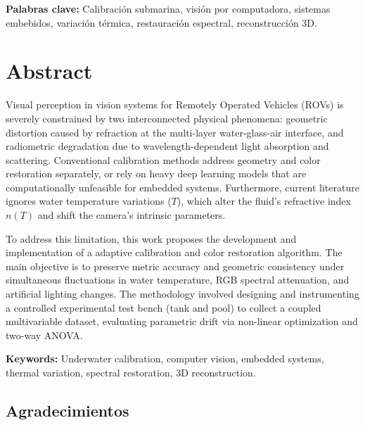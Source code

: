 \documentclass[12pt,letterpaper,spanish,twoside,openright]{report}
\begin{document}
\vspace{1em}
\noindent\textbf{Palabras clave:} Calibración submarina, visión por computadora, sistemas embebidos, variación térmica, restauración espectral, reconstrucción 3D.

\cleardoublepage

\chapter*{Abstract}
Visual perception in vision systems for Remotely Operated Vehicles (ROVs) is severely constrained by two interconnected physical phenomena: geometric distortion caused by refraction at the multi-layer water-glass-air interface, and radiometric degradation due to wavelength-dependent light absorption and scattering. Conventional calibration methods address geometry and color restoration separately, or rely on heavy deep learning models that are computationally unfeasible for embedded systems. Furthermore, current literature ignores water temperature variations ($T$), which alter the fluid's refractive index $n(T)$ and shift the camera's intrinsic parameters.

To address this limitation, this work proposes the development and implementation of a adaptive calibration and color restoration algorithm. The main objective is to preserve metric accuracy and geometric consistency under simultaneous fluctuations in water temperature, RGB spectral attenuation, and artificial lighting changes. The methodology involved designing and instrumenting a controlled experimental test bench (tank and pool) to collect a coupled multivariable dataset, evaluating parametric drift via non-linear optimization and two-way ANOVA.

\vspace{1em}
\noindent\textbf{Keywords:} Underwater calibration, computer vision, embedded systems, thermal variation, spectral restoration, 3D reconstruction.

\cleardoublepage

\cleardoublepage
\section*{Agradecimientos}

\end{document}
